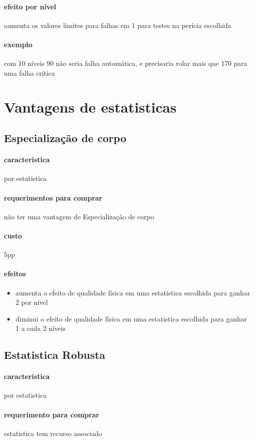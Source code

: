 \paragraph{efeito por nível} aumenta os valores limites para falhas em 1 para testes na perícia escolhida
\paragraph{exemplo} com 10 níveis 90 não seria falha automática, e precisaria rolar mais que 170 para uma falha crítica
%
%
\section{Vantagens de estatisticas}
%
\subsection{Especialização de corpo}
\paragraph{caracteristica} por estatistica
\paragraph{requerimentos para comprar} não ter uma vantagem de Especialização de corpo
\paragraph{custo} 5pp
\paragraph{efeitos}
\begin{itemize}
  \item aumenta o efeito de qualidade física em uma estatistica escolhida para ganhar 2 por nível
  \item diminui o efeito de qualidade física em uma estatistica escolhida para ganhar 1 a cada 2 níveis
\end{itemize}
%
\subsection{Estatistica Robusta}
\paragraph{caracteristica} por estatistica
\paragraph{requerimento para comprar} estatistica tem recurso associado
